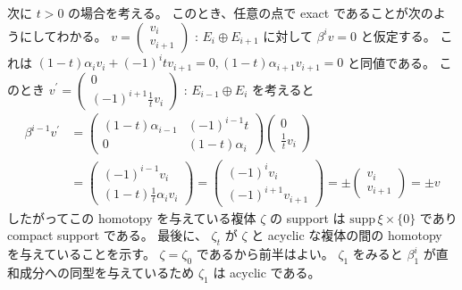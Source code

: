 \documentclass[dvipdfmx]{jsarticle}
\begin{document}
\begin{Proof}
  次に \(t>0\) の場合を考える。
  このとき、任意の点で exact であることが次のようにしてわかる。
  \(v = \begin{pmatrix}
    v_{i} \\ v_{i+1}
  \end{pmatrix}\) : \(E_{i} \oplus E_{i+1}\) に対して \(\beta^i v = 0\) と仮定する。
  これは \((1-t) \alpha_{i} v_i + (-1)^i t v_{i+1} = 0 , (1-t) \alpha_{i+1} v_{i+1} = 0\) と同値である。
  このとき \(v^\prime = \begin{pmatrix}
    0 \\ (-1)^{i+1} \frac{1}{t} v_{i}
  \end{pmatrix}\) : \(E_{i-1} \oplus E_{i}\) を考えると
  \begin{align*}
    \beta^{i-1} v^\prime
    &= \begin{pmatrix}
      (1-t) \alpha_{i-1} & (-1)^{i-1} t \\
      0 & (1-t)\alpha_{i}
    \end{pmatrix} \begin{pmatrix}
      0 \\ \frac{1}{t} v_{i}
    \end{pmatrix} \\
    &= \begin{pmatrix}
      (-1)^{i-1} v_i \\ (1-t) \frac{1}{t} \alpha_{i} v_i
    \end{pmatrix} = \begin{pmatrix}
      (-1)^{i} v_i \\ (-1)^{i+1} v_{i+1} 
    \end{pmatrix} = \pm \begin{pmatrix}
      v_i \\ v_{i+1}
    \end{pmatrix} = \pm v
  \end{align*}
  したがってこの homotopy を与えている複体 \(\zeta\) の support は \(\text{supp} \, \xi \times \{0\}\) であり compact support である。
\itemprof
  最後に、 \(\zeta_t\) が \(\zeta\) と acyclic な複体の間の homotopy を与えていることを示す。
  \(\zeta = \zeta_0\) であるから前半はよい。
  \(\zeta_1\) をみると \(\beta^i_1\) が直和成分への同型を与えているため \(\zeta_1\) は acyclic である。
\end{Proof}

\newpage
\end{document}
